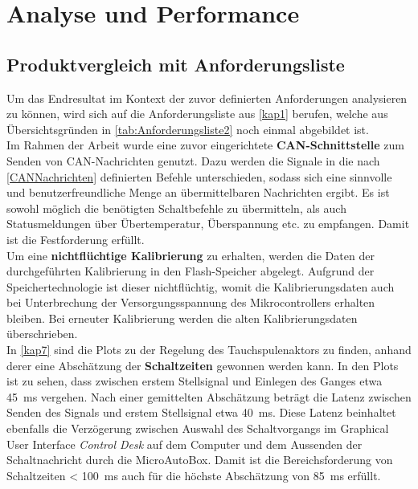 \chapter{Analyse und Performance}\label{kap7}
\section{Produktvergleich mit Anforderungsliste}\label{vergleich}
Um das Endresultat im Kontext der zuvor definierten Anforderungen analysieren zu können, wird sich auf die Anforderungsliste aus \autoref{kap1} berufen, welche aus Übersichtsgründen in \autoref{tab:Anforderungsliste2} noch einmal abgebildet ist.\\ 
Im Rahmen der Arbeit wurde eine zuvor eingerichtete \textbf{CAN-Schnittstelle} zum Senden von CAN-Nachrichten genutzt. Dazu werden die Signale in die nach \autoref{CANNachrichten} definierten Befehle unterschieden, sodass sich eine sinnvolle und benutzerfreundliche Menge an übermittelbaren Nachrichten ergibt. Es ist sowohl möglich die benötigten Schaltbefehle zu übermitteln, als auch Statusmeldungen über Übertemperatur, Überspannung etc. zu empfangen. Damit ist die Festforderung erfüllt.\\
Um eine \textbf{nichtflüchtige Kalibrierung} zu erhalten, werden die Daten der durchgeführten Kalibrierung in den Flash-Speicher abgelegt. Aufgrund der Speichertechnologie ist dieser nichtflüchtig, womit die Kalibrierungsdaten auch bei Unterbrechung der Versorgungsspannung des Mikrocontrollers erhalten bleiben. Bei erneuter Kalibrierung werden die alten Kalibrierungsdaten überschrieben.\\
In \autoref{kap7} sind die Plots zu der Regelung des Tauchspulenaktors zu finden, anhand derer eine Abschätzung der \textbf{Schaltzeiten} gewonnen werden kann. In den Plots ist zu sehen, dass zwischen erstem Stellsignal und Einlegen des Ganges etwa \SI{45}{ms} vergehen. Nach einer gemittelten Abschätzung beträgt die Latenz zwischen Senden des Signals und erstem Stellsignal etwa \SI{40}{ms}. Diese Latenz beinhaltet ebenfalls die Verzögerung zwischen Auswahl des Schaltvorgangs im Graphical User Interface \textit{Control Desk} auf dem Computer und dem Aussenden der Schaltnachricht durch die MicroAutoBox. Damit ist die Bereichsforderung von Schaltzeiten < \SI{100}{ms} auch für die höchste Abschätzung von \SI{85}{ms} erfüllt.\\
